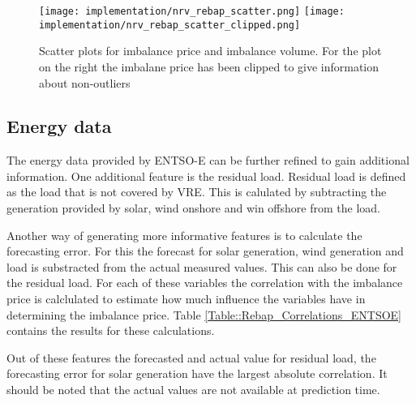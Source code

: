 \documentclass[class=scrbook, crop=false]{standalone}
\begin{document}
\begin{figure}[ht]
            \centering
            \texttt{[image: implementation/nrv\_rebap\_scatter.png]}
            \texttt{[image: implementation/nrv\_rebap\_scatter\_clipped.png]}
            \caption[Scatter plots for imbalance price and imbalance volume. For the plot on the right the imbalane price has been clipped to give information about non-outliers]{Scatter plots for imbalance price and imbalance volume. For the plot on the right the imbalane price has been clipped to give information about non-outliers}
            \label{Figure::volume_price_scatter}
\end{figure}

    \subsection{Energy data}
    \label{Section::FE_Energy_Data}
    The energy data provided by ENTSO-E can be further refined to gain additional information.
    One additional feature is the residual load. 
    Residual load is defined as the load that is not covered by VRE. 
    This is calulated by subtracting the generation provided by solar, wind onshore and win offshore from the load.
    
    Another way of generating more informative features is to calculate the forecasting error. 
    For this the forecast for solar generation, wind generation and load is substracted from the actual measured values.
    This can also be done for the residual load.
    For each of these variables the correlation with the imbalance price is calclulated to estimate how much influence the variables have in determining the imbalance price.
    Table \ref{Table::Rebap_Correlations_ENTSOE} contains the results for these calculations. 
    
    Out of these features the forecasted and actual value for residual load, the forecasting error for solar generation have the largest absolute correlation.
    It should be noted that the actual values are not available at prediction time.    
\end{document}
